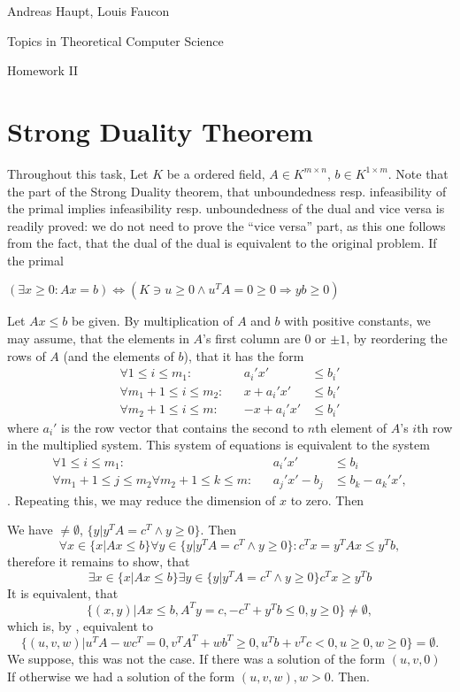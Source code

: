 \documentclass{scrartcl}
\newcommand\1{\mathbf{1}}
\begin{document}
Andreas Haupt, Louis Faucon

Topics in Theoretical Computer Science 

Homework II
\section{Strong Duality Theorem}
Throughout this task, Let $K$ be a ordered field, $A \in K^{m\times n}$, $b \in K^{1 \times m}$. Note that the part of the Strong Duality theorem, that unboundedness resp. infeasibility of the primal implies infeasibility resp. unboundedness of the dual and vice versa is readily proved: we do not need to prove the \enquote{vice versa} part, as this one follows from the fact, that the dual of the dual is equivalent to the original problem. If the primal 
\begin{Lemma}[Farkas]
$(\exists x \ge 0 \colon Ax=b) \Leftrightarrow (K \ni u \ge 0\wedge u^TA=0 \ge 0 \Rightarrow yb \ge 0)$
\end{Lemma}
\begin{Proof}
Let $Ax \le b$ be given. By multiplication of $A$ and $b$ with positive constants, we may assume, that the elements in $A$'s first column are $0$ or $\pm 1$, by reordering the rows of $A$ (and the elements of $b$), that it has the form
\begin{alignat*}
\forall 1 \le i \le m_1 \colon &&a_i' x'& \le b_i'\\
\forall m_1+1 \le i \le m_2 \colon &&x+a_i' x'& \le b_i'\\
\forall m_2+1 \le i \le m \colon &&-x+a_i' x'& \le b_i'
\end{alignat*}
where $a_i'$ is the row vector that contains the second to $n$th element of $A$'s $i$th row in the multiplied system. This system of equations is equivalent to the system
\begin{alignat*}
\forall 1 \le i \le m_1 \colon &&a_i' x'& \le b_i\\
\forall m_1+1 \le j \le m_2 \forall m_2+1 \le k\le m \colon &&a_j' x'-b_j& \le b_k - a_k'x',
\end{alignat*}
. Repeating this, we may reduce the dimension of $x$ to zero. Then 
\end{Proof}
\begin{Theorem}

\end{Theorem}
\begin{Proof}
We have $ \neq \emptyset $, $ \{y|y^TA = c^T \wedge y\ge 0\}$. Then
\[
\forall x \in \{x|Ax\le b\} \forall y \in  \{y|y^TA = c^T \wedge y\ge 0\} \colon c^Tx =y^TAx \le y^Tb,
\]
therefore it remains to show, that 
\[
\exists x \in \{x|Ax\le b\} \exists y \in  \{y|y^TA = c^T \wedge y\ge 0\} c^Tx\ge y^Tb
\]
It is equivalent, that
\[
\{(x,y) | A x \le b, A^Ty = c, -c^T + y^Tb \le 0, y \ge 0\}\neq \emptyset,
\]
which is, by , equivalent to 
\[
\{(u,v,w) | u^TA - wc^T = 0 , v^TA^T + wb^T \ge 0, u^Tb+v^Tc < 0 , u \ge 0, w \ge 0\}= \emptyset.
\]
We suppose, this was not the case. If there was a solution of the form $(u,v,0)$
\[
\]
If otherwise we had a solution of the form $(u,v,w), w >0$. Then. 
\end{Proof}
\end{document}
